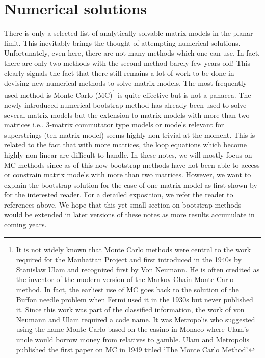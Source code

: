 \documentclass[letter,11pt]{article}
\begin{document}
\section{\label{sec:NSOL}Numerical solutions} 
There is only a selected list of analytically solvable matrix models in the planar limit. This inevitably brings 
the thought of attempting numerical solutions. Unfortunately, even here, there are not many methods 
which one can use. In fact, there are only two methods with the second method barely few years old! 
This clearly signals the fact that there still remains a lot of work to be done in devising new numerical 
methods to solve matrix models. The most frequently used method is Monte Carlo (MC)\footnote{
It is not widely known that Monte Carlo methods were central to the work required for the Manhattan Project
and first introduced in the 1940s by Stanislaw Ulam and recognized first by Von Neumann. 
He is often credited as the inventor of the modern version of the Markov Chain Monte Carlo 
method. In fact, the earliest use of MC goes back to the solution of the Buffon needle problem when Fermi used it in the 
1930s but never published it. 
Since this work was part of the classified information, the work of von Neumann and Ulam required a code name. It was Metropolis who 
suggested using the name Monte Carlo based on the casino in 
Monaco where Ulam's uncle would borrow money from relatives to gamble. Ulam and Metropolis
published the first paper on MC in 1949 titled `The Monte Carlo Method'.} 
is quite effective but is not a panacea. 
The newly introduced numerical bootstrap method has already been used to solve several matrix models \cite{Anderson:2016rcw,Lin:2020mme,Han:2020bkb,Kazakov:2021lel} but the extension to matrix models with more than two matrices i.e., 3-matrix commutator type models or  models relevant for superstrings (ten matrix model) seems highly non-trivial at the moment. This is related to the fact that with more matrices, the loop equations which become highly non-linear are difficult to handle. In these notes, we will mostly focus on MC methods since as of this now bootstrap methods have not been able to access or constrain matrix models with more than two matrices. However, we want to explain the bootstrap solution for the case of one matrix model as first shown by \cite{Lin:2020mme} for the interested reader. For a detailed exposition, we refer the reader to references above. 
We hope that this yet small section on bootstrap methods would be extended in later versions 
of these notes as more results accumulate in coming years. 
\end{document}
